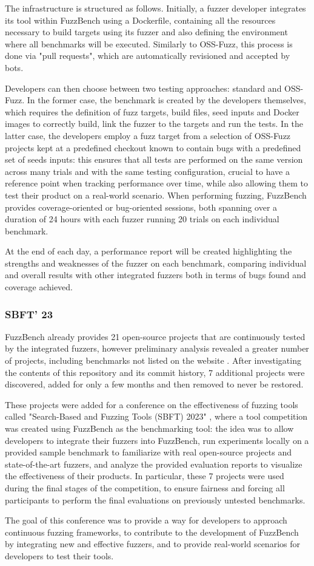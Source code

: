 The infrastructure is structured as follows.
Initially, a fuzzer developer integrates its tool within FuzzBench using a Dockerfile, containing all the resources necessary to build targets using its fuzzer and also defining the environment where all benchmarks will be executed. Similarly to OSS-Fuzz, this process is done via "pull requests", which are automatically revisioned and accepted by bots.

Developers can then choose between two testing approaches: standard and OSS-Fuzz. In the former case, the benchmark is created by the developers themselves, which requires the definition of fuzz targets, build files, seed inputs and Docker images to correctly build, link the fuzzer to the targets and run the tests. In the latter case, the developers employ a fuzz target from a selection of OSS-Fuzz projects kept at a predefined checkout known to contain bugs \cite{benchmarks} with a predefined set of seeds inputs: this ensures that all tests are performed on the same version across many trials and with the same testing configuration, crucial to have a reference point when tracking performance over time, while also allowing them to test their product on a real-world scenario. When performing fuzzing, FuzzBench provides coverage-oriented or bug-oriented sessions, both spanning over a duration of 24 hours with each fuzzer running 20 trials on each individual benchmark.

At the end of each day, a performance report will be created highlighting the strengths and weaknesses of the fuzzer on each benchmark, comparing individual and overall results with other integrated fuzzers both in terms of bugs found and coverage achieved.



\subsubsection{SBFT' 23} \label{conference}
FuzzBench already provides 21 open-source projects that are continuously tested by the integrated fuzzers, however preliminary analysis revealed a greater number of projects, including benchmarks not listed on the website \cite{benchmarks}. After investigating the contents of this repository and its commit history, 7 additional projects were discovered, added for only a few months and then removed to never be restored.  

These projects were added for a conference on the effectiveness of fuzzing tools called "Search-Based and Fuzzing Tools (SBFT) 2023" \cite{sbft23}, where a tool competition was created using FuzzBench as the benchmarking tool: the idea was to allow developers to integrate their fuzzers into FuzzBench, run experiments locally on a provided sample benchmark to familiarize with real open-source projects and state-of-the-art fuzzers, and analyze the provided evaluation reports to visualize the effectiveness of their products. In particular, these 7 projects were used during the final stages of the competition, to ensure fairness and forcing all participants to perform the final evaluations on previously untested benchmarks.

The goal of this conference was to provide a way for developers to approach continuous fuzzing frameworks, to contribute to the development of FuzzBench by integrating new and effective fuzzers, and to provide real-world scenarios for developers to test their tools.